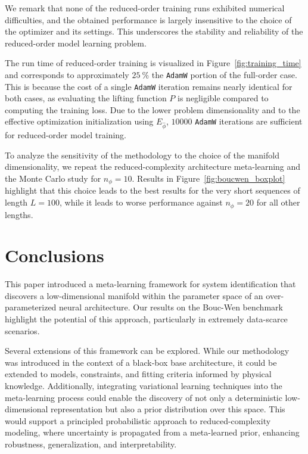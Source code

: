 \documentclass{article}
\newcommand{\redpar}{\phi}
\begin{document}
We remark that none of the reduced-order training runs exhibited numerical difficulties, and the obtained performance is largely insensitive to the choice of the optimizer and its settings. This underscores the stability and reliability of the reduced-order model learning problem.

The run time of reduced-order training is visualized in Figure~\ref{fig:training_time} and corresponds to approximately $25~\%$ the \texttt{AdamW} portion of the full-order case. This is because the cost of a single \texttt{AdamW} iteration remains nearly identical for both cases, as evaluating the lifting function $P$ is negligible compared to computing the training loss. Due to the lower problem dimensionality and to the effective optimization initialization
using $E_{\hat \phi}$, $10000$ \texttt{AdamW} iterations are sufficient for reduced-order model training.


To analyze the sensitivity of the methodology to the choice of the manifold dimensionality, we repeat the reduced-complexity architecture meta-learning and the Monte Carlo study for $n_\redpar=10$. Results in Figure~\ref{fig:boucwen_boxplot} highlight that this choice leads to the best results for the very short sequences of length $L=100$, while it leads to worse performance against $n_\redpar=20$ for all other lengths.

\section{Conclusions}
\label{sec:conclusions}
This paper introduced a meta-learning framework for system identification that discovers a low-dimensional manifold within the parameter space of an over-parameterized neural architecture. Our results on the Bouc-Wen benchmark highlight the potential of this approach, particularly in extremely data-scarce scenarios.

Several extensions of this framework can be explored. While our methodology was introduced in the context of a black-box base architecture, it could be extended to models, constraints, and fitting criteria informed by physical knowledge. Additionally, integrating variational learning techniques into the meta-learning process could enable the discovery of not only a deterministic low-dimensional representation but also a prior distribution over this space. This would support a principled probabilistic approach to reduced-complexity modeling, where uncertainty is propagated from a meta-learned prior, enhancing robustness, generalization, and interpretability.



\end{document}
